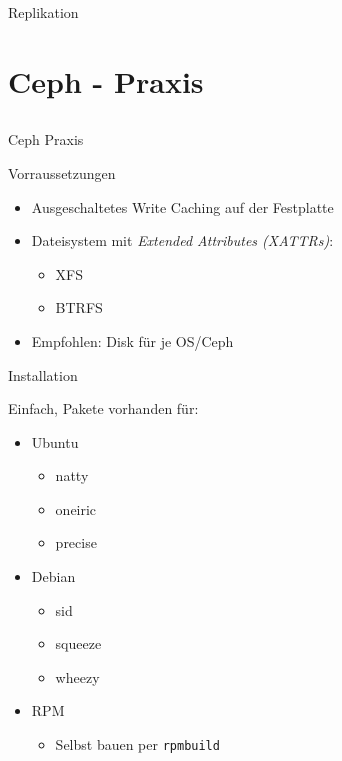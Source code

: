 \documentclass[notes=hide,yellow]{beamer}
\begin{document}
\begin{frame}{Replikation}
\end{frame}

\section{Ceph - Praxis}
\subsection*{}

\begin{frame}
	\begin{center}
	\Large{Ceph Praxis}
	\end{center}
\end{frame}


\begin{frame}{Vorraussetzungen}
	\begin{itemize}
		\item Ausgeschaltetes Write Caching auf der Festplatte
		\item Dateisystem mit \emph{Extended Attributes (XATTRs)}:
		\begin{itemize}
			\item XFS
			\item BTRFS
		\end{itemize}
		\item Empfohlen: Disk f\"ur je OS/Ceph

	\end{itemize}
\end{frame}



\begin{frame}{Installation}

	Einfach, Pakete vorhanden f\"ur:
	\begin{itemize}
		\item Ubuntu
		\begin{itemize}
			\item natty
			\item oneiric
			\item precise
		\end{itemize}
		\item Debian
		\begin{itemize}
			\item sid
			\item squeeze
			\item wheezy
		\end{itemize}
		\item RPM 
		\begin{itemize}
			\item Selbst bauen per \texttt{rpmbuild}
		\end{itemize}
	\end{itemize}

\end{frame}
\end{document}
